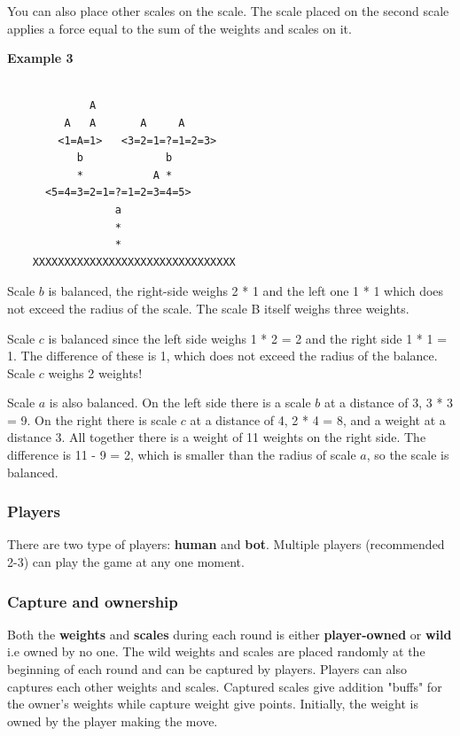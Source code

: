 \documentclass[12pt]{article}
\begin{document}
You can also place other scales on the scale. The scale placed on the second
scale applies a force equal to the sum of the weights and scales on it.

\textbf{Example 3}

\begin{verbatim}

             A
         A   A       A     A
        <1=A=1>   <3=2=1=?=1=2=3>
           b             b
           *           A *
      <5=4=3=2=1=?=1=2=3=4=5>
                 a
                 *
                 *
    XXXXXXXXXXXXXXXXXXXXXXXXXXXXXXXX
\end{verbatim}

Scale $b$ is balanced, the right-side weighs 2 * 1 and the left one 1 * 1 which
does not exceed the radius of the scale. The scale B itself weighs three
weights.

Scale $c$ is balanced since the left side weighs 1 * 2 = 2 and the right side 1
* 1 = 1. The difference of these is 1, which does not exceed the radius of the
balance. Scale $c$ weighs 2 weights!

Scale $a$ is also balanced. On the left side there is a scale $b$ at a distance
of 3, 3 * 3 = 9. On the right there is scale $c$ at a distance of 4, 2 * 4 = 8,
and a weight at a distance 3. All together there is a weight of 11 weights on
the right side. The difference is 11 - 9 = 2, which is smaller than the radius
of scale $a$, so the scale is balanced.

\subsubsection{Players}
There are two type of players: \textbf{human} and \textbf{bot}. Multiple players
(recommended 2-3) can play the game at any one moment.
\subsubsection{Capture and ownership}
\label{sec:cap}

Both the \textbf{weights} and \textbf{scales} during each round is either
\textbf{player-owned} or \textbf{wild} i.e owned by no one. The wild weights and
scales are placed randomly at the beginning of each round and can be captured by
players. Players can also captures each other weights and scales. Captured
scales give addition "buffs" for the owner's weights while capture
weight give points. Initially, the weight is owned by the player making the
move.
\end{document}
